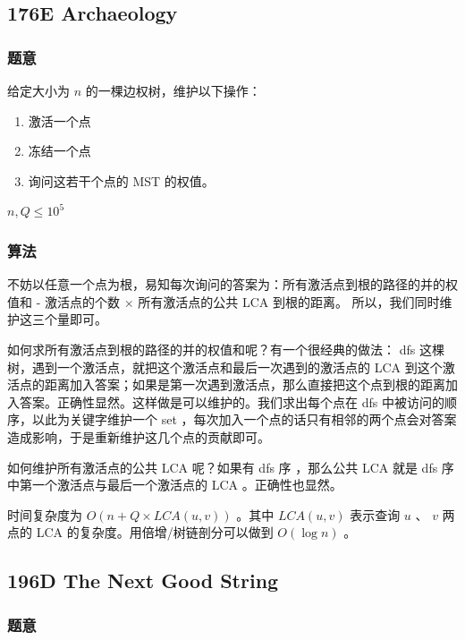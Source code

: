 \documentclass[11pt]{article}
\begin{document}
\subsection{176E  Archaeology}
\label{sec-11-1}

   \label{176E}
\subsubsection{题意}
\label{sec-11-1-1}

    给定大小为 $n$ 的一棵边权树，维护以下操作：
\begin{enumerate}
\item 激活一个点
\item 冻结一个点
\item 询问这若干个点的 MST 的权值。
\end{enumerate}

    $n, Q \leq 10^5$ 
\subsubsection{算法}
\label{sec-11-1-2}

    不妨以任意一个点为根，易知每次询问的答案为：所有激活点到根的路径的并的权值和 - 激活点的个数 $\times$ 所有激活点的公共 LCA 到根的距离。
    所以，我们同时维护这三个量即可。

    如何求所有激活点到根的路径的并的权值和呢？有一个很经典的做法： dfs 这棵树，遇到一个激活点，就把这个激活点和最后一次遇到的激活点的 LCA 到这个激活点的距离加入答案；如果是第一次遇到激活点，那么直接把这个点到根的距离加入答案。正确性显然。这样做是可以维护的。我们求出每个点在 dfs 中被访问的顺序，以此为关键字维护一个 set ，每次加入一个点的话只有相邻的两个点会对答案造成影响，于是重新维护这几个点的贡献即可。

    如何维护所有激活点的公共 LCA 呢？如果有 dfs 序 ，那么公共 LCA 就是 dfs 序中第一个激活点与最后一个激活点的 LCA 。正确性也显然。

    时间复杂度为 $O(n + Q \times LCA (u, v))$ 。其中 $LCA (u, v)$ 表示查询 $u$ 、 $v$ 两点的 LCA 的复杂度。用倍增/树链剖分可以做到 $O(\log n)$ 。
\subsection{196D  The Next Good String}
\label{sec-11-2}
\subsubsection{题意}
\label{sec-11-2-1}
\end{document}
